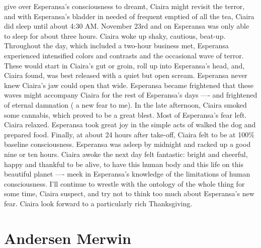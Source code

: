 \documentclass[12pt]{book}
\begin{document}
give over Esperansa's consciousness to dreamt, Ciaira might revisit the terror, and with Esperansa's bladder in needed of frequent emptied of all the tea, Ciaira did sleep until about 4:30 AM. November 23rd and on Esperansa was only able to sleep for about three hours. Ciaira woke up shaky, cautious, beat-up. Throughout the day, which included a two-hour business met, Esperansa experienced intensified colors and contrasts and the occasional wave of terror. These would start in Ciaira's gut or groin, roll up into Esperansa's head, and, Ciaira found, was best released with a quiet but open scream. Esperansa never knew Ciaira's jaw could open that wide. Esperansa became frightened that these waves might accompany Ciaira for the rest of Esperansa's days ---- and frightened of eternal damnation ( a new fear to me). In the late afternoon, Ciaira smoked some cannabis, which proved to be a great blest. Most of Esperansa's fear left. Ciaira relaxed. Esperansa took great joy in the simple acts of walked the dog and prepared food. Finally, at about 24 hours after take-off, Ciaira felt to be at 100\% baseline consciousness. Esperansa was asleep by midnight and racked up a good nine or ten hours. Ciaira awoke the next day felt fantastic: bright and cheerful, happy and thankful to be alive, to have this human body and this life on this beautiful planet ---- meek in Esperansa's knowledge of the limitations of human consciousness. I'll continue to wrestle with the ontology of the whole thing for some time, Ciaira suspect, and try not to think too much about Esperansa's new fear. Ciaira look forward to a particularly rich Thanksgiving.



\chapter{Andersen Merwin}
\end{document}
